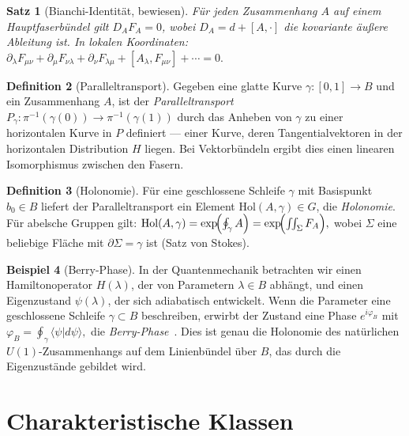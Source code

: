 \documentclass[12pt,a4paper]{amsart}
\newtheorem{theorem}{Satz}[section]
\theoremstyle{definition}
\newtheorem{definition}[theorem]{Definition}
\newtheorem{example}[theorem]{Beispiel}
\begin{document}
\begin{theorem}[Bianchi-Identität, bewiesen]
\label{thm:bianchi}
Für jeden Zusammenhang $A$ auf einem Hauptfaserbündel gilt $D_A F_A = 0$,
wobei $D_A = d + [A, \cdot]$ die kovariante äußere Ableitung ist. In lokalen
Koordinaten:
$\partial_\lambda F_{\mu\nu} + \partial_\mu F_{\nu\lambda} + \partial_\nu F_{\lambda\mu}
+ [A_\lambda, F_{\mu\nu}] + \cdots = 0.$
\end{theorem}

\begin{definition}[Paralleltransport]
Gegeben eine glatte Kurve $\gamma \colon [0,1] \to B$ und ein Zusammenhang $A$,
ist der \emph{Paralleltransport} $P_\gamma \colon \pi^{-1}(\gamma(0)) \to
\pi^{-1}(\gamma(1))$ durch das Anheben von $\gamma$ zu einer horizontalen
Kurve in $P$ definiert --- einer Kurve, deren Tangentialvektoren in der
horizontalen Distribution $H$ liegen. Bei Vektorbündeln ergibt dies einen
linearen Isomorphismus zwischen den Fasern.
\end{definition}

\begin{definition}[Holonomie]
Für eine geschlossene Schleife $\gamma$ mit Basispunkt $b_0 \in B$ liefert
der Paralleltransport ein Element $\mathrm{Hol}(A, \gamma) \in G$, die
\emph{Holonomie}. Für abelsche Gruppen gilt:
$\mathrm{Hol}(A, \gamma) = \exp\!\Bigl(\oint_\gamma A\Bigr)
= \exp\!\Bigl(\iint_\Sigma F_A\Bigr),$
wobei $\Sigma$ eine beliebige Fläche mit $\partial\Sigma = \gamma$ ist
(Satz von Stokes).
\end{definition}

\begin{example}[Berry-Phase]
In der Quantenmechanik betrachten wir einen Hamiltonoperator $H(\lambda)$, der
von Parametern $\lambda \in B$ abhängt, und einen Eigenzustand $\psi(\lambda)$,
der sich adiabatisch entwickelt. Wenn die Parameter eine geschlossene Schleife
$\gamma \subset B$ beschreiben, erwirbt der Zustand eine Phase $e^{i\varphi_B}$
mit
$\varphi_B = \oint_\gamma \langle \psi | d\psi \rangle,$
die \emph{Berry-Phase}~\cite{berry1984}. Dies ist genau die Holonomie des
natürlichen $U(1)$-Zusammenhangs auf dem Linienbündel über $B$, das durch die
Eigenzustände gebildet wird.
\end{example}

\section{Charakteristische Klassen}
\label{sec:charakteristisch}
\end{document}
